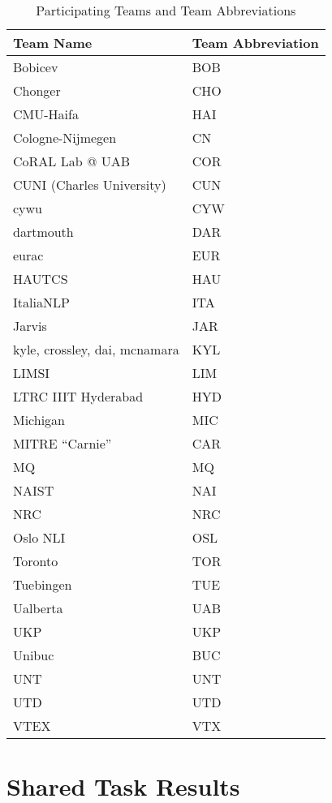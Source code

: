 \documentclass[11pt,letterpaper]{article}
\begin{document}
\begin{table*}[htbp]
\begin{tabular}{|l|l|}
\hline
Team Name & Team Abbreviation \\ \hline
Bobicev & BOB  \\ \hline
Chonger & CHO  \\ \hline
CMU-Haifa & HAI  \\ \hline
Cologne-Nijmegen &  CN \\ \hline
CoRAL Lab @ UAB &  COR \\ \hline
CUNI (Charles University) &  CUN \\ \hline
cywu &  CYW \\ \hline
dartmouth & DAR  \\ \hline
eurac & EUR  \\ \hline
HAUTCS & HAU  \\ \hline
ItaliaNLP &  ITA \\ \hline
Jarvis &   JAR\\ \hline
kyle, crossley, dai, mcnamara & KYL  \\ \hline
LIMSI & LIM  \\ \hline
LTRC IIIT Hyderabad &  HYD \\ \hline
Michigan &  MIC \\ \hline
MITRE ``Carnie'' & CAR  \\ \hline
MQ &   MQ\\ \hline
NAIST &  NAI \\ \hline
NRC &  NRC \\ \hline
Oslo NLI & OSL  \\ \hline
Toronto &  TOR \\ \hline
Tuebingen &   TUE\\ \hline
Ualberta &  UAB \\ \hline
UKP &  UKP \\ \hline
Unibuc &  BUC \\ \hline
UNT &   UNT\\ \hline
UTD &  UTD \\ \hline
VTEX &  VTX \\ \hline

\end{tabular}
\caption{Participating Teams and Team Abbreviations\label{tab:teams}}
\end{table*}

\section{Shared Task Results}
\end{document}
